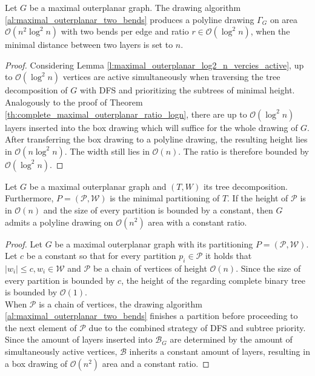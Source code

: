 \begin{theorem}
	Let $G$ be a maximal outerplanar graph. The drawing algorithm \ref{al:maximal_outerplanar_two_bends} produces a polyline drawing $\Gamma_{G}$ on area $\mathcal{O}(n^2 \log^2 n)$ with two bends per edge and ratio $r \in \mathcal{O}(\log^2 n)$, when the minimal distance between two layers is set to $n$.\label{th:maximal_outerplanar_log2_n_ratio}
\end{theorem}
\begin{proof}
	Considering Lemma \ref{l:maximal_outerplanar_log2_n_vercies_active}, up to $\mathcal{O}(\log^2 n)$ vertices are active simultaneously when traversing the tree decomposition of $G$ with DFS and prioritizing the subtrees of minimal height. Analogously to the proof of Theorem \ref{th:complete_maximal_outerplanar_ratio_logn}, there are up to $\mathcal{O}(\log^2 n)$ layers inserted into the box drawing which will suffice for the whole drawing of $G$. After transferring the box drawing to a polyline drawing, the resulting height lies in $\mathcal{O}(n\log^2 n)$. The width still lies in $\mathcal{O}(n)$. The ratio is therefore bounded by $\mathcal{O}
	(\log^2 n)$. 
\end{proof}

\begin{theorem}
	Let $G$ be a maximal outerplanar graph and $(T,W)$ its tree decomposition. Furthermore, $P=(\mathcal{P},\mathcal{W})$ is the minimal partitioning of $T$. If the height of $\mathcal{P}$ is in $\mathcal{O}(n)$ and the size of every partition is bounded by a constant, then $G$ admits a polyline drawing on $\mathcal{O}(n^2)$ area with a constant ratio.
\end{theorem}
\begin{proof}
	Let $G$ be a maximal outerplanar graph with its partitioning $P = (\mathcal{P},\mathcal{W})$. Let $c$ be a constant so that for every partition $p_i \in \mathcal{P}$ it holds that $|w_i|\leq c, w_i \in \mathcal{W}$ and $\mathcal{P}$ be a chain of vertices of height $\mathcal{O}(n)$. Since the size of every partition is bounded by $c$, the height of the regarding complete binary tree is bounded by $\mathcal{O}(1)$.\\
	When $\mathcal{P}$ is a chain of vertices, the drawing algorithm \ref{al:maximal_outerplanar_two_bends} finishes a partition before proceeding to the next element of $\mathcal{P}$ due to the combined strategy of DFS and subtree priority. Since the amount of layers inserted into $\mathcal{B}_{G}$ are determined by the amount of simultaneously active vertices, $\mathcal{B}$ inherits a constant amount of layers, resulting in a box drawing of $\mathcal{O}(n^2)$ area and a constant ratio.
\end{proof}

